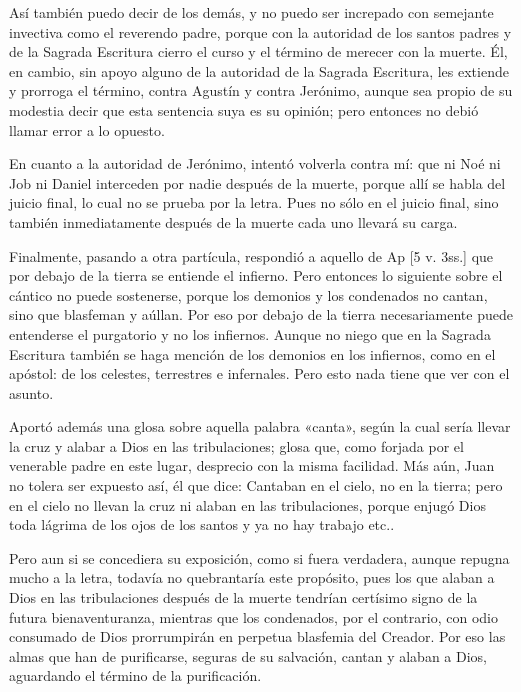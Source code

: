 Así también puedo decir de los demás, y no puedo ser increpado con semejante invectiva como el reverendo padre, porque con la autoridad de los santos padres y de la Sagrada Escritura cierro el curso y el término de merecer con la muerte. Él, en cambio, sin apoyo alguno de la autoridad de la Sagrada Escritura, les extiende y prorroga el término, contra Agustín y contra Jerónimo, aunque sea propio de su modestia decir que esta sentencia suya es su opinión; pero entonces no debió llamar error a lo opuesto.

En cuanto a la autoridad de Jerónimo, intentó volverla contra mí: que ni Noé ni Job ni Daniel interceden por nadie después de la muerte, porque allí se habla del juicio final, lo cual no se prueba por la letra. Pues no sólo en el juicio final, sino también inmediatamente después de la muerte cada uno llevará su carga.

Finalmente, pasando a otra partícula, respondió a aquello de Ap [5 v. 3ss.] que por debajo de la tierra se entiende el infierno. Pero entonces lo siguiente sobre el cántico no puede sostenerse, porque los demonios y los condenados no cantan, sino que blasfeman y aúllan. Por eso por debajo de la tierra necesariamente puede entenderse el purgatorio y no los infiernos. Aunque no niego que en la Sagrada Escritura también se haga mención de los demonios en los infiernos, como en el apóstol: de los celestes, terrestres e infernales. Pero esto nada tiene que ver con el asunto.

Aportó además una glosa sobre aquella palabra «canta», según la cual sería llevar la cruz y alabar a Dios en las tribulaciones; glosa que, como forjada por el venerable padre en este lugar, desprecio con la misma facilidad. Más aún, Juan no tolera ser expuesto así, él que dice: Cantaban en el cielo, no en la tierra; pero en el cielo no llevan la cruz ni alaban en las tribulaciones, porque enjugó Dios toda lágrima de los ojos de los santos y ya no hay trabajo etc..

Pero aun si se concediera su exposición, como si fuera verdadera, aunque repugna mucho a la letra, todavía no quebrantaría este propósito, pues los que alaban a Dios en las tribulaciones después de la muerte tendrían certísimo signo de la futura bienaventuranza, mientras que los condenados, por el contrario, con odio consumado de Dios prorrumpirán en perpetua blasfemia del Creador. \marginpar{\small[338]} Por eso las almas que han de purificarse, seguras de su salvación, cantan y alaban a Dios, aguardando el término de la purificación.

